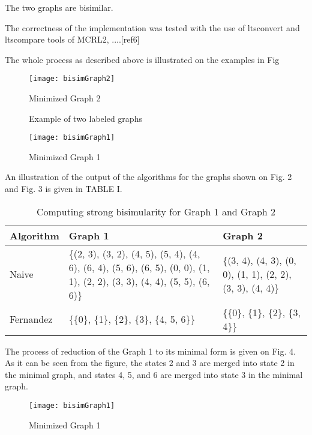 The two graphs are bisimilar.

The correctness of the implementation was tested with the use of ltsconvert and ltscompare tools of MCRL2, ....[ref6]

The whole process as described above is illustrated on the examples in Fig 

\begin{figure}[h!]
\centering
\texttt{[image: bisimGraph2]}
\caption{Minimized Graph 2}
\label{fig:bisimGraph2}
\end{figure}

\begin{figure}[h!]
\centering
{}
\label{fig:exampleGraphs}
\caption{Example of two labeled graphs}
\end{figure}

\begin{figure}[h!]
\centering
\texttt{[image: bisimGraph1]}
\caption{Minimized Graph 1}
\label{fig:bisimGraph1}
\end{figure}

An illustration of the output of the algorithms for the graphs shown on Fig. 2 and Fig. 3 is given in TABLE I.

\begin{table}[h!]
\begin{tabular}{| l | p{3.2cm}| p{3.2cm} | }
  \hline                       
  Algorithm & Graph 1 & Graph 2 \\ \hline
  Naive & \{(2, 3), (3, 2), (4, 5), 
(5, 4), (4, 6), (6, 4), (5, 6), (6, 5), (0, 0), (1, 1), (2, 2), (3, 3), (4, 4), (5, 5), (6, 6)\} & \{(3, 4), (4, 3), (0, 0), 
(1, 1), (2, 2), (3, 3), (4, 4)\} \\ \hline
  Fernandez & \{\{0\}, \{1\}, \{2\}, \{3\}, \{4, 5, 6\}\} & \{\{0\}, \{1\}, \{2\}, \{3, 4\}\} \\ \hline  
\end{tabular}
\caption{Computing strong bisimularity for Graph 1 and Graph 2}
\label{table1}
\end{table}

The process of reduction of the Graph 1 to its minimal form is given on Fig. 4. As it can be seen from the figure, the states 
2 and 3 are merged into state 2 in the minimal graph, and states 4, 5, and 6 are merged into state 3 in the minimal graph.
\begin{figure}[h!]
\centering
\texttt{[image: bisimGraph1]}
\caption{Minimized Graph 1}
\label{fig:bisimGraph1}
\end{figure}


